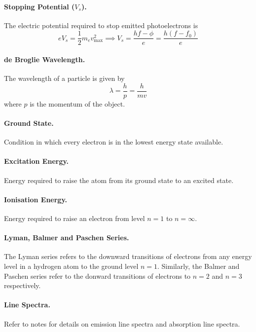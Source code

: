 \documentclass{article}
\begin{document}
\paragraph{Stopping Potential ($V_s$).} The electric potential required to stop emitted photoelectrons is \begin{equation}
eV_s = \frac{1}{2}m_ev_{\text{max}}^2 \implies V_s = \frac{hf - \phi}{e} = \frac{h(f - f_0)}{e}
\end{equation}

\paragraph{de Broglie Wavelength.} The wavelength of a particle is given by \begin{equation}
\lambda = \frac{h}{p} = \frac{h}{mv}
\end{equation} where $p$ is the momentum of the object.

\paragraph{Ground State.} Condition in which every electron is in the lowest energy state available.

\paragraph{Excitation Energy.} Energy required to raise the atom from its ground state to an excited state.

\paragraph{Ionisation Energy.} Energy required to raise an electron from level $n = 1$ to $n = \infty$.

\paragraph{Lyman, Balmer and Paschen Series.} The Lyman series refers to the downward transitions of electrons from any energy level in a hydrogen atom to the ground level $n = 1$. Similarly, the Balmer and Paschen series refer to the donward transitions of electrons to $n = 2$ and $n = 3$ respectively.

\paragraph{Line Spectra.} Refer to notes for details on emission line spectra and absorption line spectra.
\end{document}
